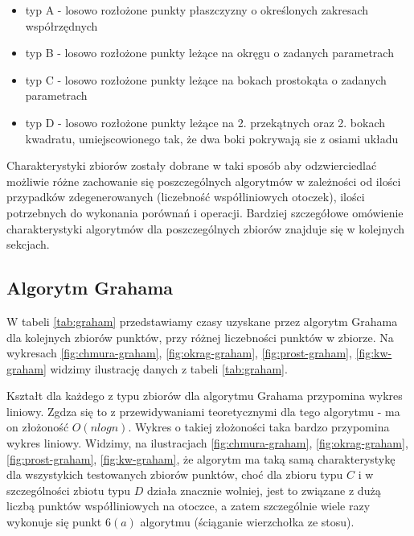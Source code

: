 \documentclass[11pt]{article}
\theoremstyle{remark} \newtheorem{definition}{def.}
\theoremstyle{definition} \newtheorem{twierdzenie}{tw.}
\begin{document}
\begin{itemize}
    \item   typ A - losowo rozłożone punkty płaszczyzny o określonych zakresach współrzędnych
    \item   typ B - losowo rozłożone punkty leżące na okręgu o zadanych parametrach
    \item   typ C - losowo rozłożone punkty leżące na bokach prostokąta o zadanych parametrach
    \item   typ D - losowo rozłożone punkty leżące na 2. przekątnych oraz 2. bokach kwadratu, umiejscowionego tak,
            że dwa boki pokrywają sie z osiami układu \\
\end{itemize}

Charakterystyki zbiorów zostały dobrane w taki sposób aby odzwierciedlać możliwie różne zachowanie się  poszczególnych algorytmów w zależności od ilości przypadków zdegenerowanych (liczebność 
współliniowych otoczek), ilości potrzebnych do wykonania porównań i operacji. Bardziej szczegółowe omówienie charakterystyki algorytmów dla poszczególnych zbiorów znajduje się w kolejnych sekcjach. 



\subsection{Algorytm Grahama}

W tabeli \ref{tab:graham} przedstawiamy czasy uzyskane przez algorytm Grahama dla kolejnych zbiorów punktów, przy różnej liczebności punktów w zbiorze. Na wykresach \ref{fig:chmura-graham}, 
\ref{fig:okrag-graham}, \ref{fig:prost-graham}, \ref{fig:kw-graham} widzimy ilustrację danych z tabeli \ref{tab:graham}.


Kształt dla każdego z typu zbiorów dla algorytmu Grahama przypomina wykres liniowy.
Zgdza się to z przewidywaniami teoretycznymi dla tego algorytmu - ma on złożoność $O(n logn)$. Wykres o takiej złożoności taka bardzo przypomina wykres liniowy.
Widzimy, na ilustracjach \ref{fig:chmura-graham}, \ref{fig:okrag-graham}, \ref{fig:prost-graham}, \ref{fig:kw-graham}, że algorytm ma taką samą charakterystykę dla wszystykich testowanych 
zbiorów punktów, choć dla zbioru typu $C$ i w szczególności zbiotu typu $D$ działa znacznie wolniej, jest to związane z dużą liczbą punktów współliniowych na otoczce, a zatem szczególnie wiele razy wykonuje 
się punkt $6(a)$ algorytmu (ściąganie wierzchołka ze stosu). 
\end{document}
